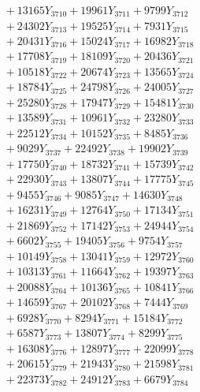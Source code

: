 \documentclass[a4paper,10pt]{article}
\begin{document}
{\begin{align}
&\;  + 13165 Y_{3710} + 19961 Y_{3711} + 9799 Y_{3712} \\[0.3ex]
&\;  + 24302 Y_{3713} + 19525 Y_{3714} + 7931 Y_{3715} \\[0.3ex]
&\;  + 20431 Y_{3716} + 15024 Y_{3717} + 16982 Y_{3718} \\[0.5ex]\allowbreak
&\;  + 17708 Y_{3719} + 18109 Y_{3720} + 20436 Y_{3721} \\[0.3ex]
&\;  + 10518 Y_{3722} + 20674 Y_{3723} + 13565 Y_{3724} \\[0.3ex]
&\;  + 18784 Y_{3725} + 24798 Y_{3726} + 24005 Y_{3727} \\[0.3ex]
&\;  + 25280 Y_{3728} + 17947 Y_{3729} + 15481 Y_{3730} \\[0.3ex]
&\;  + 13589 Y_{3731} + 10961 Y_{3732} + 23280 Y_{3733} \\[0.3ex]
&\;  + 22512 Y_{3734} + 10152 Y_{3735} + 8485 Y_{3736} \\[0.3ex]
&\;  + 9029 Y_{3737} + 22492 Y_{3738} + 19902 Y_{3739} \\[0.3ex]
&\;  + 17750 Y_{3740} + 18732 Y_{3741} + 15739 Y_{3742} \\[0.3ex]
&\;  + 22930 Y_{3743} + 13807 Y_{3744} + 17775 Y_{3745} \\[0.3ex]
&\;  + 9455 Y_{3746} + 9085 Y_{3747} + 14630 Y_{3748} \\[0.5ex]\allowbreak
&\;  + 16231 Y_{3749} + 12764 Y_{3750} + 17134 Y_{3751} \\[0.3ex]
&\;  + 21869 Y_{3752} + 17142 Y_{3753} + 24944 Y_{3754} \\[0.3ex]
&\;  + 6602 Y_{3755} + 19405 Y_{3756} + 9754 Y_{3757} \\[0.3ex]
&\;  + 10149 Y_{3758} + 13041 Y_{3759} + 12972 Y_{3760} \\[0.3ex]
&\;  + 10313 Y_{3761} + 11664 Y_{3762} + 19397 Y_{3763} \\[0.3ex]
&\;  + 20088 Y_{3764} + 10136 Y_{3765} + 10841 Y_{3766} \\[0.3ex]
&\;  + 14659 Y_{3767} + 20102 Y_{3768} + 7444 Y_{3769} \\[0.3ex]
&\;  + 6928 Y_{3770} + 8294 Y_{3771} + 15184 Y_{3772} \\[0.3ex]
&\;  + 6587 Y_{3773} + 13807 Y_{3774} + 8299 Y_{3775} \\[0.3ex]
&\;  + 16308 Y_{3776} + 12897 Y_{3777} + 22099 Y_{3778} \\[0.5ex]\allowbreak
&\;  + 20615 Y_{3779} + 21943 Y_{3780} + 21598 Y_{3781} \\[0.3ex]
&\;  + 22373 Y_{3782} + 24912 Y_{3783} + 6679 Y_{3784} \\[0.3ex]

\end{align}}
\end{document}
